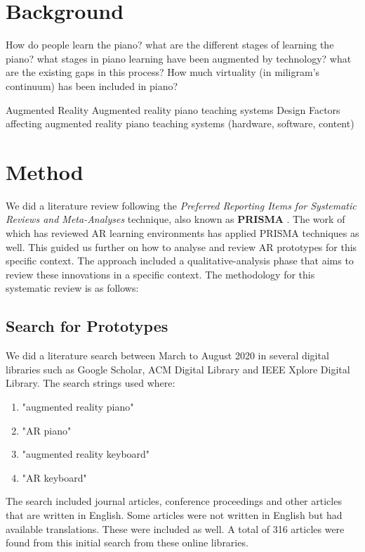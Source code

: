\documentclass[manuscript,screen]{acmart}
\begin{document}
\section{Background}
\label{sec: bg}
How do people learn the piano? what are the different stages of learning the piano? what stages in piano learning have been augmented by technology? what are the existing gaps in this process? How much virtuality (in miligram's continuum) has been included in piano? 

Augmented Reality
Augmented reality piano teaching systems
Design Factors affecting augmented reality piano teaching systems (hardware, software, content)

\section{Method}
\label{sec: method}
We did a literature review following the \textit{Preferred Reporting Items for Systematic Reviews and Meta-Analyses} technique, also known as \textbf{PRISMA} \cite{moher2009preferred}. The work of \citet{santos2013augmented} which has reviewed AR learning environments has applied PRISMA techniques as well. This guided us further on how to analyse and review AR prototypes for this specific context. The approach included a  qualitative-analysis phase that aims to review these innovations in a specific context. The methodology for this systematic review is as follows: 

\subsection{Search for Prototypes}
\label{subsec: search}
We did a literature search between March to August 2020 in several digital libraries such as Google Scholar, ACM Digital Library and IEEE Xplore Digital Library. The search strings used where:
\begin{enumerate}
    \item "augmented reality piano"
    \item "AR piano"
    \item "augmented reality keyboard"
    \item "AR keyboard"
\end{enumerate}
The search included journal articles, conference proceedings and other articles that are written in English. Some articles were not written in English but had available translations. These were included as well. A total of 316 articles were found from this initial search from these online libraries. 
\end{document}
